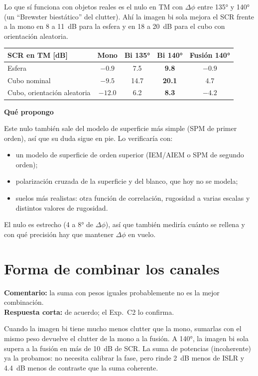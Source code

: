 \documentclass[11pt,a4paper]{article}
\newcommand{\encorto}[2]{\par\noindent\colorbox{acento!7}{\parbox{\dimexpr\linewidth-2\fboxsep}{%
\small\textbf{Comentario:} #1\\[1pt]\textbf{Respuesta corta:} #2}}\par\smallskip}
\newcommand{\paso}[1]{\par\smallskip\needspace{5\baselineskip}\noindent\textbf{\color{acento}#1}\par}
\begin{document}
Lo que sí funciona con objetos reales es el nulo en TM con $\Delta\phi$ entre 135° y 140°
(un ``Brewster biestático'' del clutter). Ahí la imagen bi sola mejora el SCR frente a la
mono en 8 a 11~dB para la esfera y en 18 a 20~dB para el cubo con orientación aleatoria.

\begin{center}
\begin{tabular}{@{}lcccc@{}}
\toprule
SCR en TM [dB] & Mono & Bi 135° & Bi 140° & Fusión 140° \\
\midrule
Esfera & $-0.9$ & 7.5 & \textbf{9.8} & $-0.9$ \\
Cubo nominal & $-9.5$ & 14.7 & \textbf{20.1} & 4.7 \\
Cubo, orientación aleatoria & $-12.0$ & 6.2 & \textbf{8.3} & $-4.2$ \\
\bottomrule
\end{tabular}
\end{center}

\paso{Qué propongo}
Este nulo también sale del modelo de superficie más simple (SPM de primer orden), así que
su duda sigue en pie. Lo verificaría con:
\begin{itemize}
  \item un modelo de superficie de orden superior (IEM/AIEM o SPM de segundo orden);
  \item polarización cruzada de la superficie y del blanco, que hoy no se modela;
  \item suelos más realistas: otra función de correlación, rugosidad a varias escalas y
  distintos valores de rugosidad.
\end{itemize}
El nulo es estrecho (4 a 8° de $\Delta\phi$), así que también mediría cuánto se rellena y
con qué precisión hay que mantener $\Delta\phi$ en vuelo.

\section{Forma de combinar los canales}

\encorto{la suma con pesos iguales probablemente no es la mejor combinación.}
{de acuerdo; el Exp.~C2 lo confirma.}

Cuando la imagen bi tiene mucho menos clutter que la mono, sumarlas con el mismo peso
devuelve el clutter de la mono a la fusión. A 140°, la imagen bi sola supera a la fusión en
más de 10~dB de SCR. La suma de potencias (incoherente) ya la probamos: no necesita
calibrar la fase, pero rinde 2~dB menos de ISLR y 4.4~dB menos de contraste que la suma
coherente.
\end{document}
